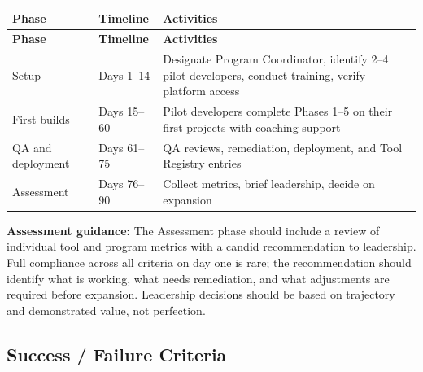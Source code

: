 \documentclass[11pt,letterpaper]{article}
\begin{document}
\begin{longtable}{@{}p{3cm}p{2.5cm}p{8cm}@{}}
\toprule
\textbf{Phase} & \textbf{Timeline} & \textbf{Activities} \\
\midrule
\endfirsthead
\toprule
\textbf{Phase} & \textbf{Timeline} & \textbf{Activities} \\
\midrule
\endhead
\bottomrule
\endlastfoot
Setup & Days 1--14 & Designate Program Coordinator, identify 2--4 pilot developers, conduct training, verify platform access \\
\midrule
First builds & Days 15--60 & Pilot developers complete Phases 1--5 on their first projects with coaching support \\
\midrule
QA and deployment & Days 61--75 & QA reviews, remediation, deployment, and Tool Registry entries \\
\midrule
Assessment & Days 76--90 & Collect metrics, brief leadership, decide on expansion \\
\end{longtable}

\textbf{Assessment guidance:} The Assessment phase should include a review of individual tool and program metrics with a candid recommendation to leadership. Full compliance across all criteria on day one is rare; the recommendation should identify what is working, what needs remediation, and what adjustments are required before expansion. Leadership decisions should be based on trajectory and demonstrated value, not perfection.

\subsection{Success / Failure Criteria}
\label{sec:success-failure-criteria}
\end{document}
